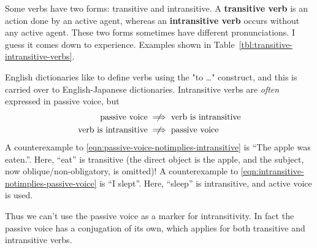 \documentclass[../nihongo-gakushuu-kyouzai.tex]{subfiles}
\begin{document}
Some verbs have two forms: transitive and intransitive. A \textbf{transitive verb} is an action done by an active agent, whereas an \textbf{intransitive verb} occurs without any active agent. These two forms sometimes have different pronunciations. I guess it comes down to experience. Examples shown in Table~\ref{tbl:transitive-intransitive-verbs}.


 English dictionaries like to define verbs using the "to \dots" construct, and this is carried over to English-Japanese dictionaries. Intransitive verbs are \emph{often} expressed in passive voice, but
\begin{align}
    \text{passive voice}&\centernot\implies\text{verb is intransitive} \label{eqn:passive-voice-notimplies-intransitive} \\
    \text{verb is intransitive}&\centernot\implies\text{passive voice} \label{eqn:intransitive-notimplies-passive-voice}
\end{align}
A counterexample to \eqref{eqn:passive-voice-notimplies-intransitive} is ``The apple was eaten.''. Here, ``eat'' is transitive (the direct object is the apple, and the subject, now oblique/non-obligatory, is omitted)! A counterexample to \eqref{eqn:intransitive-notimplies-passive-voice} is ``I slept''. Here, ``sleep'' is intransitive, and active voice is used.

Thus we can't use the passive voice as a marker for intransitivity. In fact the passive voice has a conjugation of its own, which applies for both transitive and intransitive verbs. 
\end{document}
